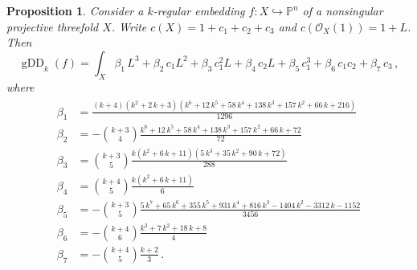 \documentclass[11pt,reqno]{amsart}
\numberwithin{equation}{section}
\theoremstyle{plain}
\numberwithin{theorem}{section}
\newtheorem{proposition}[theorem]{Proposition}
\theoremstyle{definition}
\renewcommand{\P}{\mathbb{P}}
\newcommand{\OO}{\mathcal{O}}
\newcommand{\gDD}{\operatorname{gDD}}
\begin{document}
\begin{proposition}\label{prop: gEDD k-regular threefold}
Consider a $k$-regular embedding $f\colon X\hookrightarrow\P^n$ of a nonsingular projective threefold $X$. Write $c(X)=1+c_1+c_2+c_3$ and $c(\OO_X(1))=1+L$. Then
\begin{equation}\label{eq: gEDD k-regular threefold}
    \gDD_k(f) = \int_X \beta_1\,L^3+\beta_2\,c_1L^2+\beta_3\,c_1^2L+\beta_4\,c_2L+\beta_5\,c_1^3+\beta_6\,c_1c_2+\beta_7\,c_3\,,
\end{equation}
where
\begin{align}\label{eq: coefficients beta}
\begin{split}
    \beta_1 &= \frac{(k+4)(k^{2}+2\,k+3)(k^{6}+12\,k^{5}+58\,k^{4}+138\,k^{3}+157\,k^{2}+66\,k+216)}{1296}\\
    \beta_2 &= -\binom{k+3}{4}\frac{k^{6}+12\,k^{5}+58\,k^{4}+138\,k^{3}+157\,k^{2}+66\,k+72}{72}\\
    \beta_3 &= \binom{k+3}{5}\frac{k(k^{2}+6\,k+11)(5\,k^{3}+35\,k^{2}+90\,k+72)}{288}\\
    \beta_4 &= \binom{k+4}{5}\frac{k(k^{2}+6\,k+11)}{6}\\
    \beta_5 &= -\binom{k+3}{5}\frac{5\,k^{7}+65\,k^{6}+355\,k^{5}+931\,k^{4}+816\,k^{3}-1404\,k^{2}-3312\,k-1152}{3456}\\
    \beta_6 &= -\binom{k+4}{6}\frac{k^{3}+7\,k^{2}+18\,k+8}{4}\\
    \beta_7 &= -\binom{k+4}{5}\frac{k+2}{3}\,.
\end{split}
\end{align}
\end{proposition}
\end{document}
